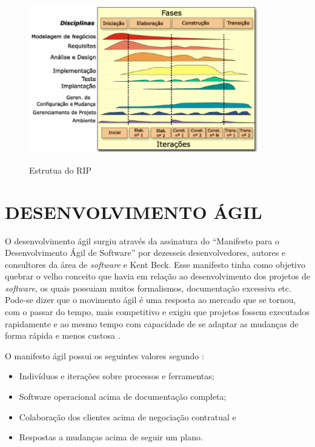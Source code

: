 \begin{figure}[htb!]
\begin{center}
\caption{Estrutua do RIP}
\label{fig:rup}
\includegraphics[width=10cm]{assets/rup} \\
\end{center}
\end{figure}

\section{DESENVOLVIMENTO ÁGIL}
\label{sec:agile}
O desenvolvimento ágil surgiu através da assinatura do ``Manifesto para o Desenvolvimento Ágil de Software'' por dezesseis desenvolvedores, autores e consultores da área de \textit{software} e Kent Beck. Esse manifesto tinha como objetivo quebrar o velho conceito que havia em relação ao desenvolvimento dos projetos de \textit{software}, os quais possuiam muitos formalismos, documentação excessiva etc. Pode-se dizer que o movimento ágil é uma resposta ao mercado que se tornou, com o passar do tempo, mais competitivo e exigiu que projetos fossem executados rapidamente e ao mesmo tempo com capacidade de se adaptar as mudanças de forma rápida e menos custosa \cite{pressman:11}.  

O manifesto ágil possui os seguintes valores segundo :

\begin{citacao}
\begin{itemize}
	\item Indivíduos e iterações sobre processos e ferramentas;
	\item Software operacional acima de documentação completa;
	\item Colaboração dos clientes acima de negociação contratual e
	\item Respostas a mudanças acima de seguir um plano.
\end{itemize}
\end{citacao}

